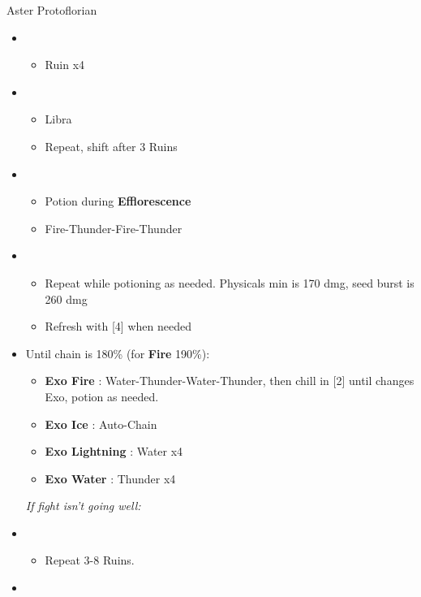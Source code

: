 \begin{battle}[1:43]{Aster Protoflorian}
	\begin{multicols}{2}
		\begin{itemize}
			\item \first
			      \begin{itemize}
				      \item Ruin x4
			      \end{itemize}
			\item \third
			      \begin{itemize}
				      \item Libra
				      \item Repeat, shift after 3 Ruins
			      \end{itemize}
			\item \fourth
			      \begin{itemize}
				      \item Potion during \textbf{Efflorescence}
				      \item Fire-Thunder-Fire-Thunder
			      \end{itemize}
			\item \fifth
			      \begin{itemize}
				      \item Repeat while potioning as needed. Physicals min is 170 dmg, seed burst is 260 dmg
				      \item Refresh with [4] when needed
			      \end{itemize}
			\item Until chain is 180\% (for \textbf{Fire} 190\%):
			      \begin{itemize}
				      \item \textbf{Exo Fire} : Water-Thunder-Water-Thunder, then chill in [2] until changes Exo, potion as needed.
				      \item \textbf{Exo Ice} : Auto-Chain
				      \item \textbf{Exo Lightning} : Water x4
				      \item \textbf{Exo Water} : Thunder x4
			      \end{itemize}
			      {\it If fight isn't going well:}
			\item \first
			      \begin{itemize}
				      \item Repeat 3-8 Ruins.
			      \end{itemize}
			      \columnbreak
			\item \fourth
			      \begin{itemize}

\end{itemize}
\end{itemize}
\end{multicols}
\end{battle}
